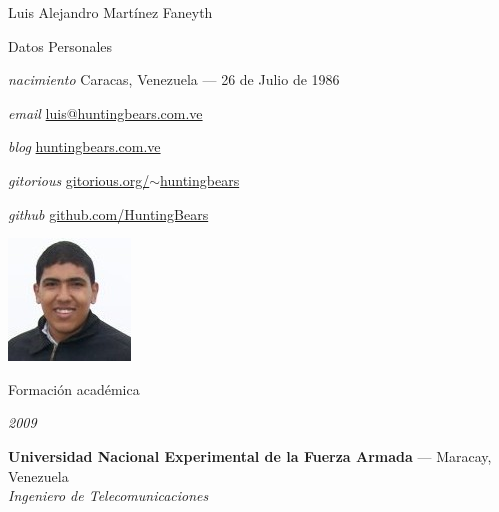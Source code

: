 \documentclass[letterpaper]{scrartcl}
\begin{document}
\begin{cv}{Luis Alejandro Mart\'inez Faneyth}
\vspace{1em}

\begin{minipage}[ht]{.7\linewidth}
\begin{cvlist}{Datos Personales}
\item[\textit{\small{nacimiento}}]{Caracas, Venezuela --- 26 de Julio de 1986}
\item[\textit{\small{email}}]{\href{mailto:luis@huntingbears.com.ve}{luis@huntingbears.com.ve}}
\item[\textit{\small{blog}}]{\href{http://huntingbears.com.ve/}{huntingbears.com.ve}}
\item[\textit{\small{gitorious}}]{\href{http://gitorious.org/~huntingbears}{gitorious.org/$\sim$huntingbears}}
\item[\textit{\small{github}}]{\href{http://github.com/HuntingBears}{github.com/HuntingBears}}
\end{cvlist}
\end{minipage}
\begin{minipage}[ht]{.3\linewidth}
\includegraphics{huntingbears.jpg}
\end{minipage}
\vspace{1em}

\begin{cvlist}{Formaci\'on acad\'emica}
\item[{\parbox[t]{6em}{\textit{\large{2009}}}}]{
	\parbox[t]{\linewidth}{
		\textbf{Universidad Nacional Experimental de la Fuerza Armada} --- Maracay, Venezuela\\
		\textit{Ingeniero de Telecomunicaciones}
	}
}
\end{cvlist}
\vspace{1em}


\end{cv}
\end{document}
